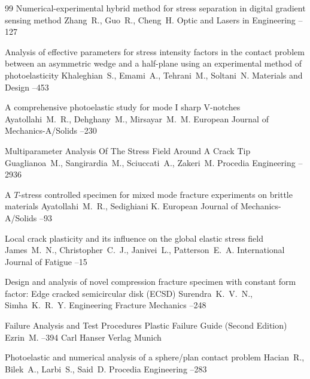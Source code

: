\begin{thebibliography}{99}
\paper Numerical-experimental hybrid method for stress separation in digital gradient sensing method
\by  Zhang~R., Guo~R., Cheng~H.
\jour Optic and Lasers in Engineering
--127

\paper Analysis of effective parameters for stress intensity factors in the contact problem between an asymmetric wedge and a half-plane using an experimental method of photoelasticity
\by  Khaleghian~S., Emami~A., Tehrani~M., Soltani~N.
\jour Materials and Design
--453

\paper A comprehensive photoelastic study for mode I sharp V-notches
\by Ayatollahi~M.~R., Dehghany~M., Mirsayar~M.~M.
\jour European Journal of Mechanics-A/Solids
--230

\paper Multiparameter Analysis Of The Stress Field Around A Crack Tip
\by Guaglianoa~M., Sangirardia~M., Sciuccati~A., Zakeri~M.
\jour Procedia Engineering
--2936

\paper A $T$-stress controlled specimen for mixed mode fracture experiments on brittle materials
\by Ayatollahi~M.~R., Sedighiani K.
\jour European Journal of Mechanics-A/Solids
--93

\paper Local crack plasticity and its influence on the global elastic stress field
\by James~M.~N., Christopher~C.~J., Janivei~L., Patterson~E.~A.
\jour International Journal of Fatigue
--15

\paper Design and analysis of novel compression fracture specimen with constant form factor: Edge cracked semicircular disk (ECSD)
\by Surendra~K.~V.~N., Simha~K.~R.~Y.
\jour Engineering Fracture Mechanics
--248

\paper Failure Analysis and Test Procedures
\inbook Plastic Failure Guide \rm (Second Edition)
\by Ezrin~M.
--394
\publ Carl Hanser Verlag
\publaddr Munich 

\paper Photoelastic and numerical analysis of a sphere/plan contact problem
\by Hacian~R., Bilek~A., Larbi~S., Said~D.
\jour Procedia Engineering
--283


\end{thebibliography}

